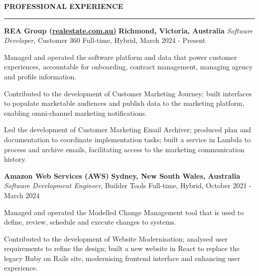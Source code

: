\documentclass{cv}
\begin{document}
\textbf{\uppercase{Professional Experience}}
\sectionlineskip
\hrule height 0.6pt
\begin{list}{}{\setlength{\leftmargin}{0pt}}
\item
    \textbf{REA Group (\href{https://realestate.com.au/}{realestate.com.au)}} \hfill \textbf{Richmond, Victoria, Australia}%
    \vspace{1.0pt} \newline 
    {\textit{Software Developer}, Customer 360} \hfill {Full-time, Hybrid, March 2024 - Present}%
    \begin{list}{\raisebox{2.0pt}{\tiny$\bullet$}\space}{\setlength{\leftmargin}{11.2pt}}
        \itemsep -5.0pt \vspace{-4.0pt}
        \item Managed and operated the software platform and data that power customer experiences, accountable for onboarding, contract management, managing agency and profile information.
        \item Contributed to the development of Customer Marketing Journey; built interfaces to populate marketable audiences and publish data to the marketing platform, enabling omni-channel marketing notifications.
        \item Led the development of Customer Marketing Email Archiver; produced plan and documentation to coordinate implementation tasks; built a service in Lambda to process and archive emails, facilitating access to the marketing communication history.
    \end{list}
\item 
    \textbf{Amazon Web Services (AWS)} \hfill \textbf{Sydney, New South Wales, Australia}%
    \vspace{1.0pt} \newline 
    {\textit{Software Development Engineer}, Builder Tools} \hfill {Full-time, Hybrid, October 2021 - March 2024}%
    \begin{list}{\raisebox{2.0pt}{\tiny$\bullet$}\space}{\setlength{\leftmargin}{11.2pt}}
        \itemsep -5.0pt \vspace{-4.0pt}
        \item Managed and operated the Modelled Change Management tool that is used to define, review, schedule and execute changes to systems.
        \item Contributed to the development of Website Modernisation; analysed user requirements to refine the design; built a new website in React to replace the legacy Ruby on Rails site, modernising frontend interface and enhancing user experience.

\end{list}
\end{list}
\end{document}
